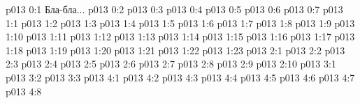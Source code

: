 \author{Совершенствователь Мудрости}
\vs p013 0:1  Бла-бла...
\vs p013 0:2 
\vs p013 0:3 \pc 
\vs p013 0:4 \pc 
\vs p013 0:5 \pc 
\vs p013 0:6 \pc 
\vs p013 0:7 
\vs p013 1:1 
\vs p013 1:2 
\vs p013 1:3 
\vs p013 1:4 
\vs p013 1:5 \pc 
\vs p013 1:6 
\vs p013 1:7 
\vs p013 1:8 \pc 
\vs p013 1:9 
\vs p013 1:10 \pc 
\vs p013 1:11 
\vs p013 1:12 \pc 
\vs p013 1:13 
\vs p013 1:14 
\vs p013 1:15 
\vs p013 1:16 
\vs p013 1:17 
\vs p013 1:18 \pc 
\vs p013 1:19 
\vs p013 1:20 \pc 
\vs p013 1:21 
\vs p013 1:22 \pc 
\vs p013 1:23 
\vs p013 2:1 
\vs p013 2:2 
\vs p013 2:3 \pc 
\vs p013 2:4 \pc 
\vs p013 2:5 \pc 
\vs p013 2:6 \pc 
\vs p013 2:7 
\vs p013 2:8 
\vs p013 2:9 \pc 
\vs p013 2:10 
\vs p013 3:1 
\vs p013 3:2 
\vs p013 3:3 \pc 
{}
\vs p013 4:1 
\vs p013 4:2 
\vs p013 4:3 
\vs p013 4:4 \pc 
\vs p013 4:5 
\vs p013 4:6 \pc 
\vs p013 4:7 
\vsetoff
\vs p013 4:8 
\quizlink

